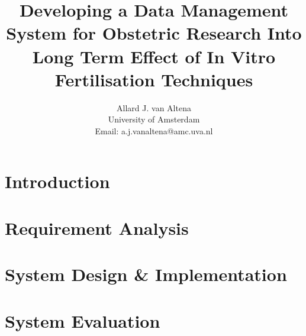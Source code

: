 \documentclass[a4paper]{report}
\title{Developing a Data Management System for Obstetric Research Into Long Term Effect of In Vitro Fertilisation Techniques}
\author{
	Allard J. van Altena\\
	University of Amsterdam\\
	Email: a.j.vanaltena@amc.uva.nl
}
\newcommand{\project}{IVF-PRN project}
\newcommand{\ivfsystem}{IVF-PRN system}
\begin{document}
	
	\tableofcontents
	
	\chapter{Introduction}
	\label{introduction}

	
	
	
	
	
	\chapter{Requirement Analysis}
	\label{requirements}
	
	
	
	
	
	
	
	
	
	
	
	\chapter{System Design \& Implementation}
	\label{system-functionality}
	
	
	
	
	
	
	
	
	
	\chapter{System Evaluation}
	\label{evaluation}
	
	
	
	
\end{document}

